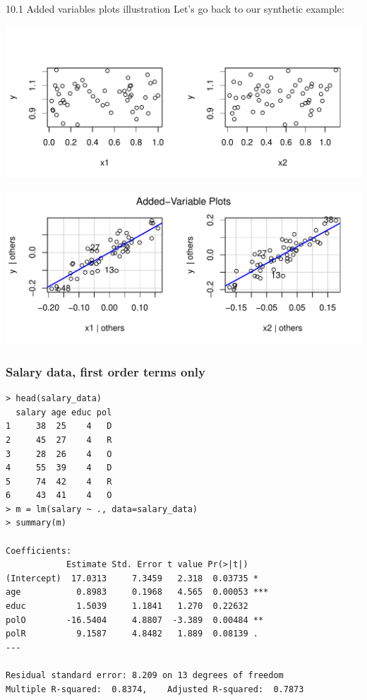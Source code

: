 \documentclass{beamer}
\begin{document}
\begin{frame}{10.1 Added variables plots illustration}
Let's go back to our synthetic example:

\vspace{-10pt}

\begin{center}
\includegraphics[height=.4\textheight]{plots/marginal.pdf}
\end{center}

\pause 
\begin{center}
\includegraphics[height=.4\textheight]{plots/av_plots.pdf}
\end{center}

\end{frame}


\begin{frame}[fragile]
\frametitle{Salary data, first order terms only}
\begin{scriptsize}
\begin{verbatim}
> head(salary_data)
  salary age educ pol
1     38  25    4   D
2     45  27    4   R
3     28  26    4   O
4     55  39    4   D
5     74  42    4   R
6     43  41    4   O
> m = lm(salary ~ ., data=salary_data)
> summary(m)

Coefficients:
            Estimate Std. Error t value Pr(>|t|)    
(Intercept)  17.0313     7.3459   2.318  0.03735 *  
age           0.8983     0.1968   4.565  0.00053 ***
educ          1.5039     1.1841   1.270  0.22632    
polO        -16.5404     4.8807  -3.389  0.00484 ** 
polR          9.1587     4.8482   1.889  0.08139 .  
---

Residual standard error: 8.209 on 13 degrees of freedom
Multiple R-squared:  0.8374,	Adjusted R-squared:  0.7873 
\end{verbatim}
\end{scriptsize}
\end{frame}
\end{document}
